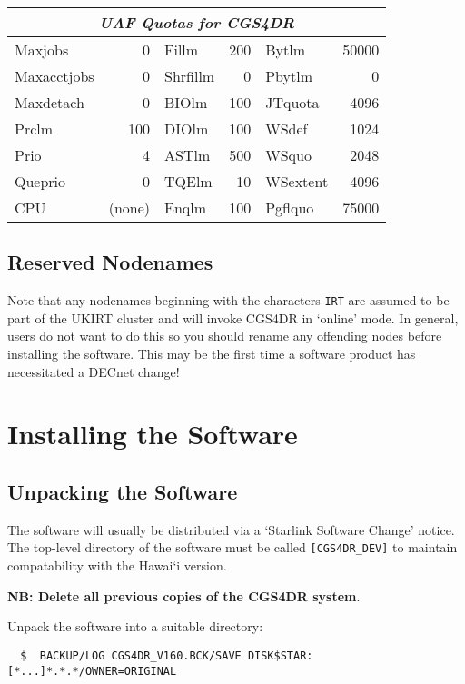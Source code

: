 \begin{center}
\begin{tabular}{|l r|l r|l r|}
\hline
\multicolumn{6}{|c|}{\sl UAF Quotas for CGS4DR} \\
\hline
Maxjobs     & 0      & Fillm    & 200  & Bytlm    & 50000 \\
Maxacctjobs & 0      & Shrfillm & 0    & Pbytlm   & 0 \\
Maxdetach   & 0      & BIOlm    & 100  & JTquota  & 4096 \\
Prclm       & 100    & DIOlm    & 100  & WSdef    & 1024 \\
Prio        & 4      & ASTlm    & 500  & WSquo    & 2048 \\
Queprio     & 0      & TQElm    & 10   & WSextent & 4096 \\
CPU         & (none) & Enqlm    & 100  & Pgflquo  & 75000 \\
\hline
\end{tabular}
\end{center}

\subsection{Reserved Nodenames}

Note that any nodenames beginning with the characters {\tt IRT} are assumed 
to be part of the UKIRT cluster and will invoke CGS4DR in `online' mode. 
In general, users do not want to do this so you should rename any offending 
nodes before installing the software. This may be the first time a software 
product has necessitated a DECnet change!

\section{Installing the Software}

\subsection{Unpacking the Software}
The software will usually be distributed via a `Starlink Software Change' 
notice. The top-level directory of the software must be called 
{\tt [CGS4DR\_DEV]} to maintain compatability with the Hawai`i version.

{\bf NB: Delete all previous copies of the CGS4DR system}.

Unpack the software into a suitable directory:

\begin{verbatim}
  $  BACKUP/LOG CGS4DR_V160.BCK/SAVE DISK$STAR:[*...]*.*.*/OWNER=ORIGINAL
\end{verbatim}

